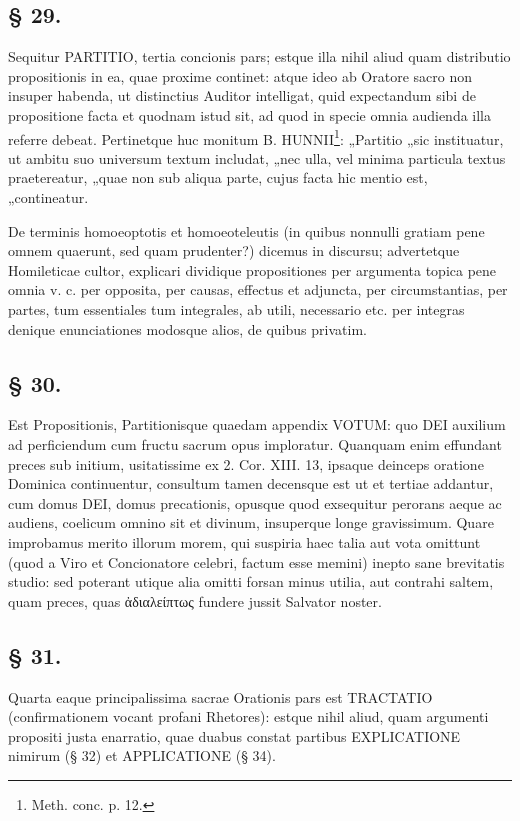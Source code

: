 \subsection*{§ 29.}

Sequitur PARTITIO, tertia concionis pars; estque illa nihil aliud quam distributio propositionis in ea, quae proxime continet: atque ideo ab Oratore sacro non insuper habenda, ut distinctius Auditor intelligat, quid expectandum sibi de propositione facta et quodnam istud sit, ad quod in specie omnia audienda illa referre debeat. Pertinetque huc monitum B. HUNNII\footnote{Meth. conc. p. 12.}: „Partitio „sic instituatur, ut ambitu suo universum textum includat, „nec ulla, vel minima particula textus praetereatur, „quae non sub aliqua parte, cujus facta hic mentio est, „contineatur.

De terminis homoeoptotis et homoeoteleutis (in quibus nonnulli gratiam pene omnem quaerunt, sed quam prudenter?) dicemus in discursu; advertetque Homileticae cultor, explicari dividique propositiones per argumenta topica pene omnia v. c. per opposita, per causas, effectus et adjuncta, per circumstantias, per partes, tum essentiales tum integrales, ab utili, necessario etc. per integras denique enunciationes modosque alios, de quibus privatim.

\subsection*{§ 30.}

Est Propositionis, Partitionisque quaedam appendix VOTUM: quo DEI auxilium ad perficiendum cum fructu sacrum opus imploratur. Quanquam enim effundant preces sub initium, usitatissime ex 2. Cor. XIII.
13, ipsaque deinceps oratione Dominica continuentur, consultum tamen decensque est ut et tertiae addantur, cum domus DEI, domus precationis, opusque quod exsequitur perorans aeque ac audiens, coelicum omnino sit et divinum, insuperque longe gravissimum. Quare improbamus merito illorum morem, qui suspiria haec talia aut vota omittunt (quod a Viro et Concionatore celebri, factum esse memini) inepto sane brevitatis studio: sed poterant utique alia omitti forsan minus utilia, aut contrahi saltem, quam preces, quas ἀδιαλείπτως fundere jussit Salvator noster.

\subsection*{§ 31.}

Quarta eaque principalissima sacrae Orationis pars est TRACTATIO (confirmationem vocant profani Rhetores): estque nihil aliud, quam argumenti propositi justa enarratio, quae duabus constat partibus EXPLICATIONE nimirum (§ 32) et APPLICATIONE (§ 34).

